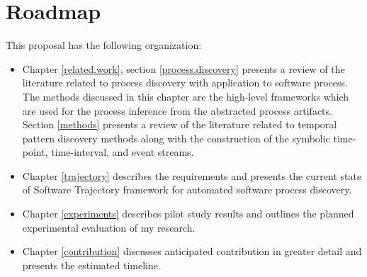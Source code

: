 \section{Roadmap}
This proposal has the following organization:
\begin{itemize}
	\item Chapter \ref{related.work}, section \ref{process.discovery} presents a review of the literature related to process discovery with application to software process. The methods discussed in this chapter are the high-level frameworks which are used for the process inference from the abstracted process artifacts. Section \ref{methods} presents a review of the literature related to temporal pattern discovery methods along with the construction of the symbolic time-point, time-interval, and event streams.
	\item Chapter \ref{trajectory} describes the requirements and presents the current state of Software Trajectory framework for automated software process discovery.
	\item Chapter \ref{experiments} describes pilot study results and outlines the planned experimental evaluation of my research.
	\item Chapter \ref{contribution} discusses anticipated contribution in greater detail and presents the estimated timeline.
\end{itemize}
